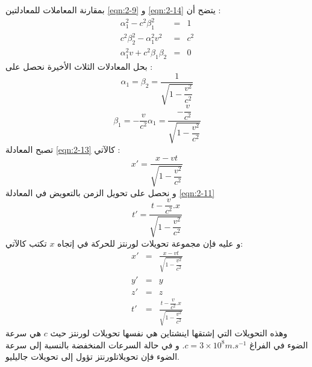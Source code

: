 بمقارنة المعاملات للمعادلتين \eqref{eqn:2-9} و \eqref{eqn:2-14} يتضح أن :
\begin{equation}
	\label{eqn:2-15}
	\begin{array}{ccl}
		\alpha_{1}^{2} -c^{2}\beta_{1}^{2} & = &  1 \\
		c^{2}\beta_{2}^{2}-\alpha_{1}^{2}v^{2} & = & c^{2} \\
		\alpha_{1}^{2}v + c^{2}\beta_{1}\beta_{2} & = & 0
	\end{array}
\end{equation}
بحل المعادلات الثلاث اﻷخيرة نحصل على :
\begin{equation}
	\label{eqn:2-16}
	\alpha_{1}=\beta_{2}= \frac{1}{\sqrt{1-\dfrac{v^{2}}{c^{2}}}}
\end{equation}
\begin{equation}
	\label{eqn:2-17}
	\beta_{1}=-\frac{v}{c^{2}}\alpha_{1}= \frac{-\dfrac{v}{c^{2}}}{\sqrt{1-\dfrac{v^{2}}{c^{2}}}}
\end{equation}
تصبح المعادلة \eqref{eqn:2-13} كاﻵتي :
\begin{equation}
	\label{eqn:2-18}
	x' = \frac{x-vt}{\sqrt{1-\dfrac{v^{2}}{c^{2}}}}
\end{equation}
و نحصل على تحويل الزمن بالتعويض في المعادلة \eqref{eqn:2-11} 
\begin{equation}
	\label{eqn:2-19}
	t'= \frac{t-\dfrac{v}{c^{2}}.x}{\sqrt{1-\dfrac{v^{2}}{c^{2}}}}
\end{equation} 
و عليه فإن  مجموعة تحويلات لورنتز للحركة في إتجاه $x$ تكتب كاﻵتي:
\begin{equation}
	\label{eqn:2-20}
	\begin{array}{ccl}
		x' & = &  \frac{x-vt}{\sqrt{1-\dfrac{v^{2}}{c^{2}}}} \\
		y' & = & y \\
		z' & = & z \\
		t' & = & \frac{t-\dfrac{v}{c^{2}}.x}{\sqrt{1-\dfrac{v^{2}}{c^{2}}}}
	\end{array}
\end{equation}
وهذه التحويلات التي إشتقها اينشتاين هي نفسها تحويلات لورنتز حيث 
$c$ 
هي سرعة الضوء في الفراغ 
$c = 3\times 10^{8} m.s^{-1}$. 
و في حالة السرعات المنخفضة بالنسبة إلى سرعة الضوء فإن تحويلاتلورنتز تؤول إلى تحويلات جاليليو.

